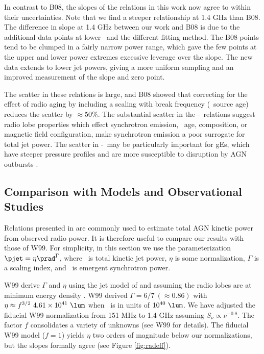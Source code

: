 \documentclass{emulateapj}
\begin{document}
In contrast to B08, the slopes of the relations in this work now agree
to within their uncertainties. Note that we find a steeper
relationship at 1.4 GHz than B08. The difference in slope at 1.4 GHz
between our work and B08 is due to the additional data points at lower
\pjet\ and the different fitting method. The B08 points tend to be
clumped in a fairly narrow power range, which gave the few points at
the upper and lower power extremes excessive leverage over the
slope. The new data extends to lower jet powers, giving a more uniform
sampling and an improved measurement of the slope and zero point.

The scatter in these relations is large, and B08 showed that
correcting for the effect of radio aging by including a scaling with
break frequency (\ie\ source age) reduces the scatter by $\approx
50\%$. The substantial scatter in the \pjet-\prad\ relations suggest
radio lobe properties which effect synchrotron emission, \eg\ age,
composition, or magnetic field configuration, make synchrotron
emission a poor surrogate for total jet power. The scatter in
\pjet-\prad\ may be particularly important for gEs, which have steeper
pressure profiles and are more susceptible to disruption by AGN
outbursts \citep{2006MNRAS.372.1161W, 2008ApJ...687L..53P}.

\subsection{Comparison with Models and Observational Studies}
\label{sec:models}

Relations presented in \citet[][hereafter W99]{w99} are commonly used
to estimate total AGN kinetic power from observed radio power. It is
therefore useful to compare our results with those of W99. For
simplicity, in this section we use the parameterization $\pjet = \eta
\prad^{\Gamma}$, where \pjet\ is total kinetic jet power, $\eta$ is
some normalization, $\Gamma$ is a scaling index, and \prad\ is
emergent synchrotron power.

W99 derive $\Gamma$ and $\eta$ using the jet model of
\citet{1991MNRAS.250..581F} and assuming the radio lobes are at
minimum energy density \citep[see][for
  details]{1980ARA&A..18..165M}. W99 derived $\Gamma = 6/7 ~(\approx
0.86)$ with $\eta \approx f^{3/2}~4.61 \times 10^{41} ~\lum$ when
\prad\ is in units of $10^{40} ~\lum$. We have adjusted the fiducial
W99 normalization from 151 MHz to 1.4 GHz assuming $S_{\nu} \propto
\nu^{-0.8}$. The factor $f$ consolidates a variety of unknowns (see
W99 for details). The fiducial W99 model ($f=1$) yields $\eta$ two
orders of magnitude below our normalizations, but the slopes formally
agree (see Figure \ref{fig:radeff}).
\end{document}
